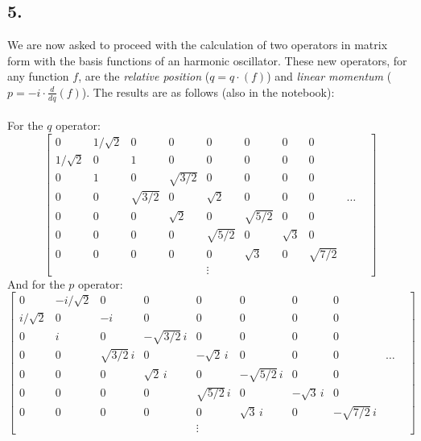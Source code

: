 \documentclass[a4paper, 12pt, notitlepage]{article}
\begin{document}
\subsection*{5.}
We are now asked to proceed with the calculation of two operators in matrix form with the basis functions of an harmonic oscillator. These new operators, for any function $f$, are the \textit{relative position} ($q = q\cdot(f)$) and \textit{linear momentum} ($p = -i\cdot \frac{d}{dq}(f)$). The results are as follows (also in the notebook):\\\\
For the $q$ operator:
\begin{equation*}
\begin{bmatrix}
	0 & 1/\sqrt{2} & 0 & 0 & 0 & 0 & 0 & 0 &  \\
	1/\sqrt{2} & 0 & 1 & 0 & 0 & 0 & 0 & 0 & \\
	0 & 1 & 0 & \sqrt{3/2} & 0 & 0 & 0 & 0 & & \\
	0 & 0 & \sqrt{3/2} & 0 & \sqrt{2} & 0 & 0 & 0 & \dots \\
	0 & 0 & 0 & \sqrt{2} & 0 & \sqrt{5/2} & 0 & 0 & \\
	0 & 0 & 0 & 0 & \sqrt{5/2} & 0 & \sqrt{3} & 0 & \\
	0 & 0 & 0 & 0 & 0 & \sqrt{3} & 0 & \sqrt{7/2} &  \\
	& & & & \vdots
\end{bmatrix}
\end{equation*}
And for the $p$ operator:
\begin{equation*}
\begin{bmatrix}
	0 & -i/\sqrt{2} & 0 & 0 & 0 & 0 & 0 & 0 &  \\
	i/\sqrt{2} & 0 & -i & 0 & 0 & 0 & 0 & 0 & \\
	0 & i & 0 & -\sqrt{3/2}\,i & 0 & 0 & 0 & 0 & & \\
	0 & 0 & \sqrt{3/2}\,i & 0 & -\sqrt{2}\,i & 0 & 0 & 0 & \dots \\
	0 & 0 & 0 & \sqrt{2}\,i & 0 & -\sqrt{5/2}\,i & 0 & 0 & \\
	0 & 0 & 0 & 0 & \sqrt{5/2}\,i & 0 & -\sqrt{3}\,i & 0 & \\
	0 & 0 & 0 & 0 & 0 & \sqrt{3}\,i & 0 & -\sqrt{7/2}\,i &  \\
	& & & & \vdots
\end{bmatrix}
\end{equation*}
\end{document}
